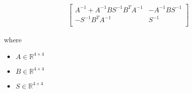 \documentclass[12pt]{article}
\begin{document}
\begin{align*}
\begin{bmatrix}
\textit{A}^{-1} + \textit{A}^{-1}\textit{B}\textit{S}^{-1}\textit{B}^T\textit{A}^{-1} & -\textit{A}^{-1}\textit{B}\textit{S}^{-1}\\
-\textit{S}^{-1}\textit{B}^T\textit{A}^{-1} & \textit{S}^{-1}\\
\end{bmatrix}
\end{align*}

where
\begin{itemize}
\item $\textit{A} \in \mathbb{R}^{ 4 \times 4 }$
\item $\textit{B} \in \mathbb{R}^{ 4 \times 4 }$
\item $\textit{S} \in \mathbb{R}^{ 4 \times 4 }$
\end{itemize}
\end{document}
